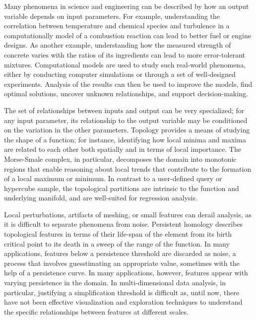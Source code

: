 \maketitle
\label{sec:intro}

Many phenomena in science and engineering can be described by how an output variable depends on input parameters. For example, understanding the correlation between temperature and chemical species and turbulence in a computationally model of a combustion reaction can lead to better fuel or engine designs. As another example, understanding how the measured strength of concrete varies with the ratios of its ingredients can lead to more error-tolerant mixtures. Computational models are used to study such real-world phenomena, either by conducting computer simulations or through a set of well-designed experiments. Analysis of the results can then be used to improve the models, find optimal solutions, uncover unknown relationships, and support decision-making.

The set of relationships between inputs and output can be very specialized; for any input parameter, its relationship to the output variable may be conditioned on the variation in the other parameters. Topology provides a means of studying the shape of a function; for instance, identifying how local minima and maxima are related to each other both spatially and in terms of local importance. The Morse-Smale complex, in particular, decomposes the domain into monotonic regions that enable reasoning about local trends that contribute to the formation of a local maximum or minimum. In contrast to a user-defined query or hypercube sample, the topological partitions are intrinsic to the function and underlying manifold, and are well-suited for regression analysis. 

Local perturbations, artifacts of meshing, or small features can derail analysis, as it is difficult to separate phenomena from noise. Persistent homology describes topological features in terms of their life-span of the element from its birth critical point to its death in a sweep of the range of the function. In many applications, features below a persistence threshold are discarded as noise, a process that involves guesstimating an appropriate value, sometimes with the help of a persistence curve. In many applications, however, features appear with varying persistence in the domain. In multi-dimensional data analysis, in particular, justifying a simplification threshold is difficult as, until now, there have not been effective visualization and exploration techniques to understand the specific relationships between features at different scales. 

